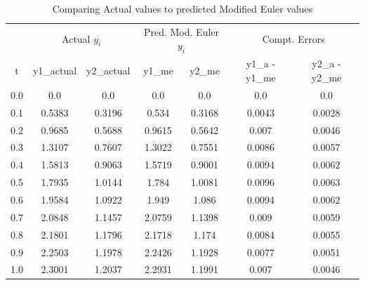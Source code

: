 \documentclass[12pt,oneside]{book}
\begin{document}
		\begin{table}[h!]
			\caption{Comparing Actual values to predicted Modified Euler values}
			\begin{tabular}{ccccccc}
				\toprule
				& \multicolumn{2}{c}{Actual $ y_{i} $} & \multicolumn{2}{c}{Pred. Mod. Euler $ y_{i} $ } & \multicolumn{2}{c}{Compt. Errors} \\
				t&y1\_actual&y2\_actual&y1\_me&y2\_me&y1\_a - y1\_me&y2\_a - y2\_me \\ \midrule
				0.0&0.0&0.0&0.0&0.0&0.0&0.0 \\
				0.1&0.5383&0.3196&0.534&0.3168&0.0043&0.0028 \\
				0.2&0.9685&0.5688&0.9615&0.5642&0.007&0.0046 \\
				0.3&1.3107&0.7607&1.3022&0.7551&0.0086&0.0057 \\
				0.4&1.5813&0.9063&1.5719&0.9001&0.0094&0.0062 \\
				0.5&1.7935&1.0144&1.784&1.0081&0.0096&0.0063 \\
				0.6&1.9584&1.0922&1.949&1.086&0.0094&0.0062 \\
				0.7&2.0848&1.1457&2.0759&1.1398&0.009&0.0059 \\
				0.8&2.1801&1.1796&2.1718&1.174&0.0084&0.0055 \\
				0.9&2.2503&1.1978&2.2426&1.1928&0.0077&0.0051 \\
				1.0&2.3001&1.2037&2.2931&1.1991&0.007&0.0046 \\
				\bottomrule
			\end{tabular}
		\end{table}
	
\end{document}
